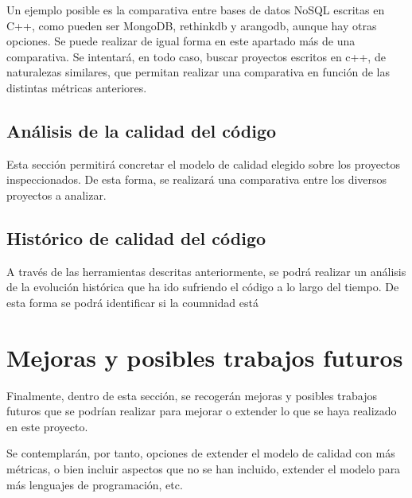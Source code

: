 \documentclass[11pt]{article}
\begin{document}
Un ejemplo posible es la comparativa entre bases de datos NoSQL escritas en C++, como pueden ser MongoDB, rethinkdb y arangodb, aunque hay otras opciones. Se puede realizar de igual forma en este apartado más de una comparativa. Se intentará, en todo caso, buscar proyectos escritos en c++, de naturalezas similares, que permitan realizar una comparativa en función de las distintas métricas anteriores.

\subsection{Análisis de la calidad del código}

Esta sección permitirá concretar el modelo de calidad elegido sobre los proyectos inspeccionados. De esta forma, se realizará una comparativa entre los diversos proyectos a analizar.

\subsection{Histórico de calidad del código}

A través de las herramientas descritas anteriormente, se podrá realizar un análisis de la evolución histórica que ha ido sufriendo el código a lo largo del tiempo. De esta forma se podrá identificar si la coumnidad está 

\section{Mejoras y posibles trabajos futuros}

Finalmente, dentro de esta sección, se recogerán mejoras y posibles trabajos futuros que se podrían realizar para mejorar o extender lo que se haya realizado en este proyecto.

Se contemplarán, por tanto, opciones de extender el modelo de calidad con más métricas, o bien incluir aspectos que no se han incluido, extender el modelo para más lenguajes de programación, etc.
\end{document}
